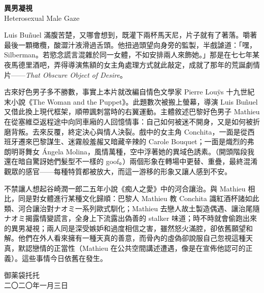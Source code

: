 \documentclass[10pt]{article}
\begin{document}
\begin{flushleft}
\textbf{異男凝視}\\
Heterosexual Male Gaze\\
\end{flushleft}
\vspace{3em}

Luis Buñuel
滿腹苦楚，又哪會想到，既灌下兩杯馬天尼，片子就有了著落。嚼著最後一顆橄欖，酸澀汁液滑過舌頭。他扭過頭望向身旁的監製，半戲謔道：「嘿，Silberman。若慾念謊言混雜於同一女體，不如安排兩人來飾她。」那是在七七年某夜馬德里酒吧，弄得導演焦額的女主角處理方式就此敲定，成就了那年的荒誕劇情片{——}\emph{That
Obscure Object of Desire}。

古來好色男子多不勝數，事實上本片就改編自情色文學家 Pierre Louÿs
十九世紀末小說《The Woman and the Puppet》。此題數次被搬上螢幕，導演
Luis Buñuel
又借此換上現代框架，順帶諷刺當時的右翼運動。主體敘述巴黎好色男子 Mathieu
在從塞維亞返程途中向同車廂的人回憶情事：自己如何被迷不開身，又是如何被折磨背叛。去來反覆，終定決心與情人決裂。戲中的女主角
Conchita，一面是從西班牙遷來巴黎謀生、迷霧般羞赧又暗藏辛辣的 Carole
Bouquet；一面是熾烈的弗朗明哥舞女 Ángela
Molina，風情萬種，空中浮著她的異域色誘素。（開頭階段我還在暗自驚訝她們髮型不一樣的
goof。）兩個形象在轉場中更替、重疊，最終混淆觀眾的感官{——}每種特質都被放大，而這一游移的形象又讓人感到不安。

不禁讓人想起谷崎潤一郎二五年小說《痴人之愛》中的河合讓治。與 Mathieu
相比，同是對女體進行某種文化歸順：巴黎人 Mathieu 教 Conchita
識紅酒杯諸如此類、河合讓治對ナオミ一系列歐式馴化；Mathieu
去戀人故土製造偶遇、讓治尾隨ナオミ揭露情變謊言，全身上下流露出偽善的
stalker
味道；時不時就會偷跑出來的異男凝視；兩人同是深受嫉妒和過度相信之害，雖然怒火滿腔，卻依舊願望和解。他們在外人看來擁有一種天真的善意，而骨內的虛偽卻說服自己忽視這種天真，默認戀情的正當性（Mathieu
在公共空間講述遭遇，像是在宣佈他認可的正義）。這些事情今日依舊在發生。

\vspace{3em}
\begin{flushleft}
\small{御薬袋托托\\
二〇二〇年一月三日}
\end{flushleft}
\end{document}
